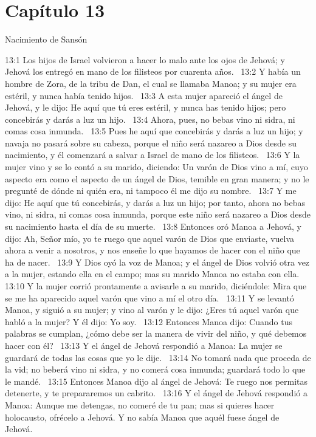 \section*{Capítulo 13}
Nacimiento de Sansón  

13:1 Los hijos de Israel volvieron a hacer lo malo ante los ojos de Jehová; y Jehová los entregó en mano de los filisteos por cuarenta años.  
13:2 Y había un hombre de Zora, de la tribu de Dan, el cual se llamaba Manoa; y su mujer era estéril, y nunca había tenido hijos.  
13:3 A esta mujer apareció el ángel de Jehová, y le dijo: He aquí que tú eres estéril, y nunca has tenido hijos; pero concebirás y darás a luz un hijo.  
13:4 Ahora, pues, no bebas vino ni sidra, ni comas cosa inmunda.  
13:5 Pues he aquí que concebirás y darás a luz un hijo; y navaja no pasará sobre su cabeza, porque el niño será nazareo a Dios desde su nacimiento, y él comenzará a salvar a Israel de mano de los filisteos.  
13:6 Y la mujer vino y se lo contó a su marido, diciendo: Un varón de Dios vino a mí, cuyo aspecto era como el aspecto de un ángel de Dios, temible en gran manera; y no le pregunté de dónde ni quién era, ni tampoco él me dijo su nombre.  
13:7 Y me dijo: He aquí que tú concebirás, y darás a luz un hijo; por tanto, ahora no bebas vino, ni sidra, ni comas cosa inmunda, porque este niño será nazareo a Dios desde su nacimiento hasta el día de su muerte.  
13:8 Entonces oró Manoa a Jehová, y dijo: Ah, Señor mío, yo te ruego que aquel varón de Dios que enviaste, vuelva ahora a venir a nosotros, y nos enseñe lo que hayamos de hacer con el niño que ha de nacer.  
13:9 Y Dios oyó la voz de Manoa; y el ángel de Dios volvió otra vez a la mujer, estando ella en el campo; mas su marido Manoa no estaba con ella.  
13:10 Y la mujer corrió prontamente a avisarle a su marido, diciéndole: Mira que se me ha aparecido aquel varón que vino a mí el otro día.  
13:11 Y se levantó Manoa, y siguió a su mujer; y vino al varón y le dijo: ¿Eres tú aquel varón que habló a la mujer? Y él dijo: Yo soy.  
13:12 Entonces Manoa dijo: Cuando tus palabras se cumplan, ¿cómo debe ser la manera de vivir del niño, y qué debemos hacer con él?  
13:13 Y el ángel de Jehová respondió a Manoa: La mujer se guardará de todas las cosas que yo le dije.  
13:14 No tomará nada que proceda de la vid; no beberá vino ni sidra, y no comerá cosa inmunda; guardará todo lo que le mandé.  
13:15 Entonces Manoa dijo al ángel de Jehová: Te ruego nos permitas detenerte, y te prepararemos un cabrito.  
13:16 Y el ángel de Jehová respondió a Manoa: Aunque me detengas, no comeré de tu pan; mas si quieres hacer holocausto, ofrécelo a Jehová. Y no sabía Manoa que aquél fuese ángel de Jehová.  
